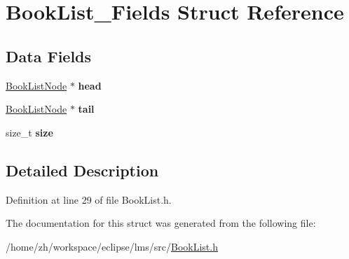 \hypertarget{structBookList__Fields}{\section{Book\-List\-\_\-\-Fields Struct Reference}
\label{structBookList__Fields}
}
\subsection*{Data Fields}
\begin{DoxyCompactItemize}
\item 
\hypertarget{structBookList__Fields_ac904f47f02e1ed605944a8b19cdcb188}{\hyperlink{structBookListNode}{Book\-List\-Node} $\ast$ {\bfseries head}}\label{structBookList__Fields_ac904f47f02e1ed605944a8b19cdcb188}

\item 
\hypertarget{structBookList__Fields_a34d8d0adb67f424709fbaa3bab298620}{\hyperlink{structBookListNode}{Book\-List\-Node} $\ast$ {\bfseries tail}}\label{structBookList__Fields_a34d8d0adb67f424709fbaa3bab298620}

\item 
\hypertarget{structBookList__Fields_aa0ef7d99f4594b2c17209c3a7332da53}{size\-\_\-t {\bfseries size}}\label{structBookList__Fields_aa0ef7d99f4594b2c17209c3a7332da53}

\end{DoxyCompactItemize}


\subsection{Detailed Description}


Definition at line 29 of file Book\-List.\-h.



The documentation for this struct was generated from the following file\-:\begin{DoxyCompactItemize}
\item 
/home/zh/workspace/eclipse/lms/src/\hyperlink{BookList_8h}{Book\-List.\-h}\end{DoxyCompactItemize}
